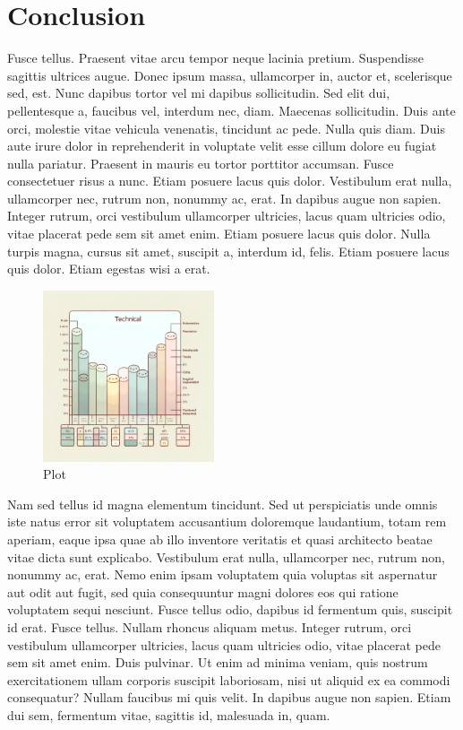 \section{Conclusion}

Fusce tellus. Praesent vitae arcu tempor neque lacinia pretium. Suspendisse sagittis ultrices augue. Donec ipsum massa, ullamcorper in, auctor et, scelerisque sed, est. Nunc dapibus tortor vel mi dapibus sollicitudin. Sed elit dui, pellentesque a, faucibus vel, interdum nec, diam. Maecenas sollicitudin. Duis ante orci, molestie vitae vehicula venenatis, tincidunt ac pede. Nulla quis diam. Duis aute irure dolor in reprehenderit in voluptate velit esse cillum dolore eu fugiat nulla pariatur. Praesent in mauris eu tortor porttitor accumsan. Fusce consectetuer risus a nunc. Etiam posuere lacus quis dolor. Vestibulum erat nulla, ullamcorper nec, rutrum non, nonummy ac, erat. In dapibus augue non sapien. Integer rutrum, orci vestibulum ullamcorper ultricies, lacus quam ultricies odio, vitae placerat pede sem sit amet enim. Etiam posuere lacus quis dolor. Nulla turpis magna, cursus sit amet, suscipit a, interdum id, felis. Etiam posuere lacus quis dolor. Etiam egestas wisi a erat.

\begin{figure}[h]
    \centering
    \includegraphics[width=0.45\textwidth]{images/plot.jpg}
    \caption{Plot}
    \label{fig:plot}
\end{figure}

Nam sed tellus id magna elementum tincidunt. Sed ut perspiciatis unde omnis iste natus error sit voluptatem accusantium doloremque laudantium, totam rem aperiam, eaque ipsa quae ab illo inventore veritatis et quasi architecto beatae vitae dicta sunt explicabo. Vestibulum erat nulla, ullamcorper nec, rutrum non, nonummy ac, erat. Nemo enim ipsam voluptatem quia voluptas sit aspernatur aut odit aut fugit, sed quia consequuntur magni dolores eos qui ratione voluptatem sequi nesciunt. Fusce tellus odio, dapibus id fermentum quis, suscipit id erat. Fusce tellus. Nullam rhoncus aliquam metus. Integer rutrum, orci vestibulum ullamcorper ultricies, lacus quam ultricies odio, vitae placerat pede sem sit amet enim. Duis pulvinar. Ut enim ad minima veniam, quis nostrum exercitationem ullam corporis suscipit laboriosam, nisi ut aliquid ex ea commodi consequatur? Nullam faucibus mi quis velit. In dapibus augue non sapien. Etiam dui sem, fermentum vitae, sagittis id, malesuada in, quam.

